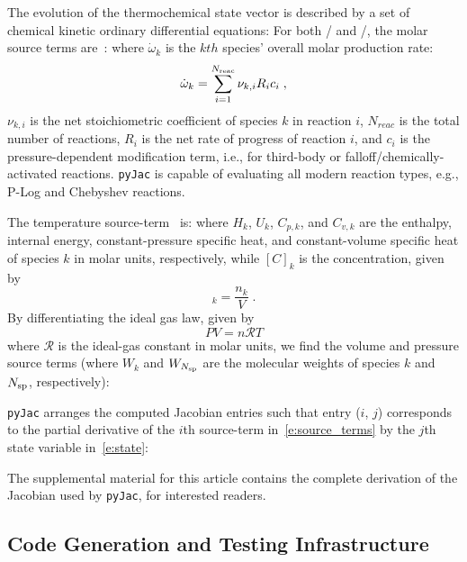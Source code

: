 \documentclass[12pt,number,sort&compress,preprint]{elsarticle}
\begin{document}
The evolution of the thermochemical state vector is described by a set of chemical kinetic ordinary differential equations:
For both \conp/ and \conv/, the molar source terms are~\cite{TurnsStephenR2012Aitc}:
where $\dot{\omega}_k$ is the $kth$ species' overall molar production rate:
\begin{equation}
 \dot{\omega}_{k} = \sum_{i=1}^{\nr/} \nu_{k, i} R_{i} c_{i} \;,
\end{equation}
$\nu_{k, i}$ is the net stoichiometric coefficient of species $k$ in reaction $i$, $N_{reac}$ is the total number of reactions, $R_{i}$ is the net rate of progress of reaction $i$, and $c_{i}$ is the pressure-dependent modification term, i.e., for third-body or falloff\slash chemically-activated reactions.
\texttt{pyJac} is capable of evaluating all modern reaction types, e.g., P-Log and Chebyshev reactions.

The temperature source-term~\cite{TurnsStephenR2012Aitc} is:
where $H_k$, $U_k$, $C_{p,k}$, and $C_{v, k}$ are the enthalpy, internal energy, constant-pressure specific heat, and constant-volume specific heat of species $k$ in molar units, respectively, while $[C]_{k}$ is the concentration, given by
\begin{equation}
 [C]_{k} = \frac{n_{k}}{V} \;.
\end{equation}
By differentiating the ideal gas law, given by
\begin{equation}
 PV = n\mathcal{R}T
\end{equation}
where $\mathcal{R}$ is the ideal-gas constant in molar units, we find the volume and pressure source terms (where $W_k$ and $W_{\ns/}$ are the molecular weights of species $k$ and $\ns/$, respectively):

\texttt{pyJac} arranges the computed Jacobian entries such that entry ($i$, $j$) corresponds to the partial derivative of the $i$th source-term in~\cref{e:source_terms} by the $j$th state variable in~\cref{e:state}:

The supplemental material for this article contains the complete derivation of the Jacobian used by \texttt{pyJac}, for interested readers.

\subsection{Code Generation and Testing Infrastructure}
\label{s:unittest}
\end{document}
